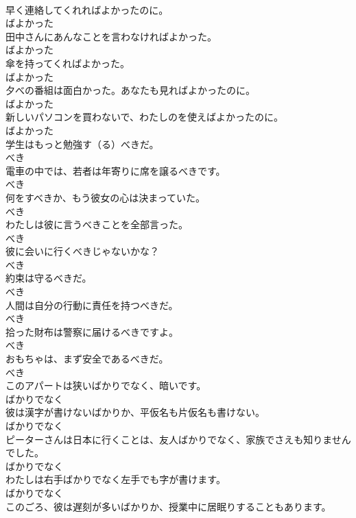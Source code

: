 \documentclass[8pt]{extreport}
\begin{document}
\begin{CJK}{UTF8}{min}
\\	早く連絡してくれればよかったのに。	
\\	ばよかった	
\\	田中さんにあんなことを言わなければよかった。	
\\	ばよかった	
\\	傘を持ってくればよかった。	
\\	ばよかった	
\\	夕べの番組は面白かった。あなたも見ればよかったのに。	
\\	ばよかった	
\\	新しいパソコンを買わないで、わたしのを使えばよかったのに。	
\\	ばよかった	
\\	学生はもっと勉強す（る）べきだ。	
\\	べき	
\\	電車の中では、若者は年寄りに席を譲るべきです。	
\\	べき	
\\	何をすべきか、もう彼女の心は決まっていた。	
\\	べき	
\\	わたしは彼に言うべきことを全部言った。	
\\	べき	
\\	彼に会いに行くべきじゃないかな？	
\\	べき	
\\	約束は守るべきだ。	
\\	べき	
\\	人間は自分の行動に責任を持つべきだ。	
\\	べき	
\\	拾った財布は警察に届けるべきですよ。	
\\	べき	
\\	おもちゃは、まず安全であるべきだ。	
\\	べき	
\\	このアパートは狭いばかりでなく、暗いです。	
\\	ばかりでなく	
\\	彼は漢字が書けないばかりか、平仮名も片仮名も書けない。	
\\	ばかりでなく	
\\	ピーターさんは日本に行くことは、友人ばかりでなく、家族でさえも知りませんでした。	
\\	ばかりでなく	
\\	わたしは右手ばかりでなく左手でも字が書けます。	
\\	ばかりでなく	
\\	このごろ、彼は遅刻が多いばかりか、授業中に居眠りすることもあります。	

\end{CJK}
\end{document}
